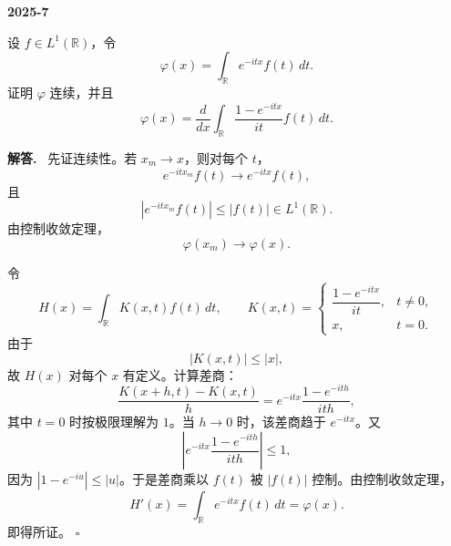 \documentclass[UTF8]{ctexart}
\newcommand{\R}{\mathbb R}
\newenvironment{problem}[1]{\par\medskip\noindent\textbf{#1}\par\smallskip}{\par}
\newenvironment{solution}{\par\noindent\textbf{解答.}\ }{\hfill$\square$\par\medskip}
\begin{document}
\begin{problem}{2025-7}
设 \(f\in L^1(\R)\)，令
\[
  \varphi(x)=\int_{\R}e^{-itx}f(t)\,dt.
\]
证明 \(\varphi\) 连续，并且
\[
  \varphi(x)=\frac{d}{dx}\int_{\R}\frac{1-e^{-itx}}{it}f(t)\,dt.
\]
\end{problem}
\begin{solution}
先证连续性。若 \(x_m\to x\)，则对每个 \(t\)，
\[
  e^{-itx_m}f(t)\to e^{-itx}f(t),
\]
且
\[
  |e^{-itx_m}f(t)|\le |f(t)|\in L^1(\R).
\]
由控制收敛定理，
\[
  \varphi(x_m)\to\varphi(x).
\]

令
\[
  H(x)=\int_{\R}K(x,t)f(t)\,dt,\qquad
  K(x,t)=
  \begin{cases}
    \dfrac{1-e^{-itx}}{it}, & t\ne0,\\
    x, & t=0.
  \end{cases}
\]
由于
\[
  |K(x,t)|\le |x|,
\]
故 \(H(x)\) 对每个 \(x\) 有定义。计算差商：
\[
  \frac{K(x+h,t)-K(x,t)}{h}
  =e^{-itx}\frac{1-e^{-ith}}{ith},
\]
其中 \(t=0\) 时按极限理解为 \(1\)。当 \(h\to0\) 时，该差商趋于 \(e^{-itx}\)。又
\[
  \left|e^{-itx}\frac{1-e^{-ith}}{ith}\right|\le1,
\]
因为 \(|1-e^{-iu}|\le |u|\)。于是差商乘以 \(f(t)\) 被 \(|f(t)|\) 控制。由控制收敛定理，
\[
  H'(x)=\int_{\R}e^{-itx}f(t)\,dt=\varphi(x).
\]
即得所证。
\end{solution}
\end{document}
